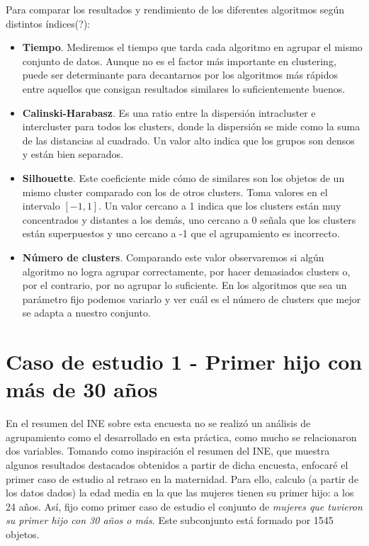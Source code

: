 \documentclass[a4paper, 20pt]{article}
\begin{document}
Para comparar los resultados y rendimiento de los diferentes algoritmos según distintos índices(?):
\begin{itemize}
\item \textbf{Tiempo}. Mediremos el tiempo que tarda cada algoritmo en agrupar el mismo conjunto de datos. Aunque no es el factor más importante en clustering, puede ser determinante para decantarnos por los algoritmos más rápidos entre aquellos que consigan resultados similares lo suficientemente buenos.
\item \textbf{Calinski-Harabasz}. Es una ratio entre la dispersión intracluster e intercluster para todos los clusters, donde la dispersión se mide como la suma de las distancias al cuadrado. Un valor alto indica que los grupos son densos y están bien separados.
\item \textbf{Silhouette}. Este coeficiente mide cómo de similares son los objetos de un mismo cluster comparado con los de otros clusters. Toma valores en el intervalo $[-1,1]$. Un valor cercano a 1 indica que los clusters están muy concentrados y distantes a los demás, uno cercano a 0 señala que los clusters están superpuestos y uno cercano a -1 que el agrupamiento es incorrecto.
\item \textbf{Número de clusters}. Comparando este valor observaremos si algún algoritmo no logra agrupar correctamente, por hacer demasiados clusters o, por el contrario, por no agrupar lo suficiente. En los algoritmos que sea un parámetro fijo podemos variarlo y ver cuál es el número de clusters que mejor se adapta a nuestro conjunto.
\end{itemize}

\section{Caso de estudio 1 - Primer hijo con más de 30 años}
\label{sec:caso1}
En el resumen del INE sobre esta encuesta no se realizó un análisis de agrupamiento como el desarrollado en esta práctica, como mucho se relacionaron dos variables. Tomando como inspiración el resumen \cite{resINE} del INE, que muestra algunos resultados destacados obtenidos a partir de dicha encuesta, enfocaré el primer caso de estudio al retraso en la maternidad. Para ello, calculo (a partir de los datos dados) la edad media en la que las mujeres tienen su primer hijo: a los 24 años. Así, fijo como primer caso de estudio el conjunto de \textit{mujeres que tuvieron su primer hijo con 30 años o más}. Este subconjunto está formado por 1545 objetos.
\end{document}
